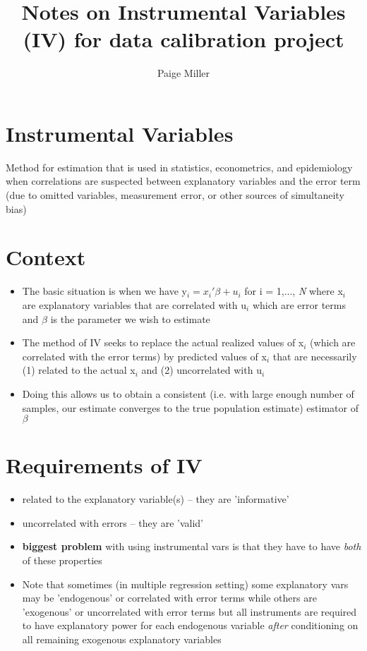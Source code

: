 \documentclass{article}
\begin{document}
\title{Notes on Instrumental Variables (IV) for data calibration project}

\author{
  Paige Miller
}

\maketitle

\section{Instrumental Variables}
   Method for estimation that is used in statistics, econometrics, and epidemiology when correlations are suspected between explanatory variables and the error term (due to omitted variables, measurement error, or other sources of simultaneity bias)
  
\section{Context}
  \begin{itemize}
  \item The basic situation is when we have y$_{i} = x_{i}'\beta + u_{i}$ for i = 1,..., \textit{N} where x$_{i}$ are explanatory variables that are correlated with u$_{i}$ which are error terms and $\beta$ is the parameter we wish to estimate
  \item The method of IV seeks to replace the actual realized values of x$_{i}$ (which are correlated with the error terms) by predicted values of x$_{i}$ that are necessarily (1) related to the actual x$_{i}$ and (2) uncorrelated with u$_{i}$
  \item Doing this allows us to obtain a consistent (i.e. with large enough number of samples, our estimate converges to the true population estimate) estimator of \textit{$\beta$} 
  
  \end{itemize} 

\section{Requirements of IV}
  \begin{itemize}
  \item related to the explanatory variable(s) -- they are 'informative'
  \item uncorrelated with errors -- they are 'valid'
  \item \textbf{biggest problem} with using instrumental vars is that they have to have \textit{both} of these properties
  \item Note that sometimes (in multiple regression setting) some explanatory vars may be 'endogenous' or correlated with error terms while others are 'exogenous' or uncorrelated with error terms but all instruments are required to have explanatory power for each endogenous variable \textit{after} conditioning on all remaining exogenous explanatory variables
  \end{itemize}
\end{document}

